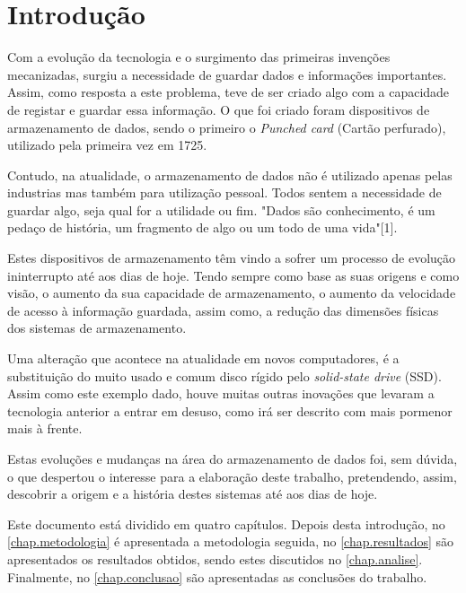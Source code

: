 \documentclass{report}
\begin{document}
\clearpage
{}

\chapter{Introdução}
\label{chap.introducao}
	Com a evolução da tecnologia e o surgimento das primeiras invenções mecanizadas, surgiu a necessidade de guardar dados e informações importantes. Assim, como resposta a este problema, teve de ser criado algo com a capacidade de registar e guardar essa informação. O que foi criado foram dispositivos de armazenamento de dados, sendo o primeiro o \textit{Punched card} (Cartão perfurado), utilizado pela primeira vez em 1725. 
\vspace{1mm}
	
	Contudo, na atualidade, o armazenamento de dados não é utilizado apenas pelas industrias mas também para utilização pessoal. Todos sentem a necessidade de guardar algo, seja qual for a utilidade ou fim. "Dados são conhecimento, é um pedaço de história, um fragmento de algo ou um todo de uma vida"[1].
\vspace{1mm}
	
	Estes dispositivos de armazenamento têm vindo a sofrer um processo de evolução ininterrupto até aos dias de hoje. Tendo sempre como base as suas origens e como visão, o aumento da sua capacidade de armazenamento, o aumento da velocidade de acesso à informação guardada, assim como, a redução das dimensões físicas dos sistemas de armazenamento.
\vspace{1mm}
	
	Uma alteração que acontece na atualidade em novos computadores, é a substituição do muito usado e comum disco rígido pelo \textit{solid-state drive} (SSD). Assim como este exemplo dado, houve muitas outras inovações que levaram a tecnologia anterior a entrar em desuso, como irá ser descrito com mais pormenor mais à frente.
\vspace{1mm}

	Estas evoluções e mudanças na área do armazenamento de dados foi, sem dúvida, o que despertou o interesse para a elaboração deste trabalho, pretendendo, assim, descobrir a origem e a história destes sistemas até aos dias de hoje.
\vspace{2mm}



Este documento está dividido em quatro capítulos.
Depois desta introdução,
no \autoref{chap.metodologia} é apresentada a metodologia seguida,
no \autoref{chap.resultados} são apresentados os resultados obtidos,
sendo estes discutidos no \autoref{chap.analise}.
Finalmente, no \autoref{chap.conclusao} são apresentadas
as conclusões do trabalho.
\end{document}

